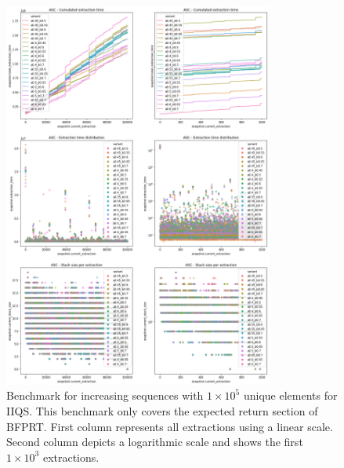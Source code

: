 \begin{figure}[!ht]
    \centering
    \includegraphics[width=0.79\textwidth]{./fragments/04_experimental_execution/images/04_alphabeta_detail_increasing_inner.png}
    \caption{Benchmark for increasing sequences with $1\times10^5$ unique elements for IIQS. This benchmark only covers the expected return section of BFPRT. First column represents all extractions using a linear scale. Second column depicts a logarithmic scale and shows the first $1\times10^3$ extractions. }
    \label{FIG:05_ALPHABETA_BENCHMARK_ASC_INNER}
\end{figure}

